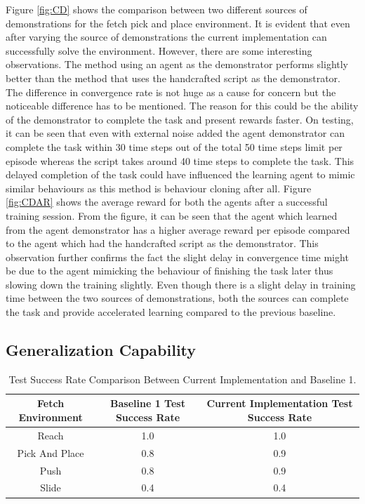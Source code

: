 Figure \ref{fig:CD} shows the comparison between two different sources of demonstrations for the fetch pick and place environment. It is evident that even after varying the source of demonstrations the current implementation can successfully solve the environment. However, there are some interesting observations. The method using an agent as the demonstrator performs slightly better than the method that uses the handcrafted script as the demonstrator. The difference in convergence rate is not huge as a cause for concern but the noticeable difference has to be mentioned. The reason for this could be the ability of the demonstrator to complete the task and present rewards faster. On testing, it can be seen that even with external noise added the agent demonstrator can complete the task within 30 time steps out of the total 50 time steps limit per episode whereas the script takes around 40 time steps to complete the task. This delayed completion of the task could have influenced the learning agent to mimic similar behaviours as this method is behaviour cloning after all. Figure \ref{fig:CDAR} shows the average reward for both the agents after a successful training session. From the figure, it can be seen that the agent which learned from the agent demonstrator has a higher average reward per episode compared to the agent which had the handcrafted script as the demonstrator. This observation further confirms the fact the slight delay in convergence time might be due to the agent mimicking the behaviour of finishing the task later thus slowing down the training slightly. Even though there is a slight delay in training time between the two sources of demonstrations, both the sources can complete the task and provide accelerated learning compared to the previous baseline. \\

\subsection{Generalization Capability}

\begin{table}[h!]
\centering
\begin{tabular}{|c|c|c|}
\hline
Fetch Environment & Baseline 1 Test Success Rate & Current Implementation Test Success Rate \\ \hline
Reach          & 1.0 & 1.0 \\ \hline
Pick And Place & 0.8 & 0.9 \\ \hline
Push           & 0.8 & 0.9 \\ \hline
Slide          & 0.4 & 0.4 \\ \hline
\end{tabular}
\caption{Test Success Rate Comparison Between Current Implementation and Baseline 1.}
\label{tab:GC}
\end{table}

